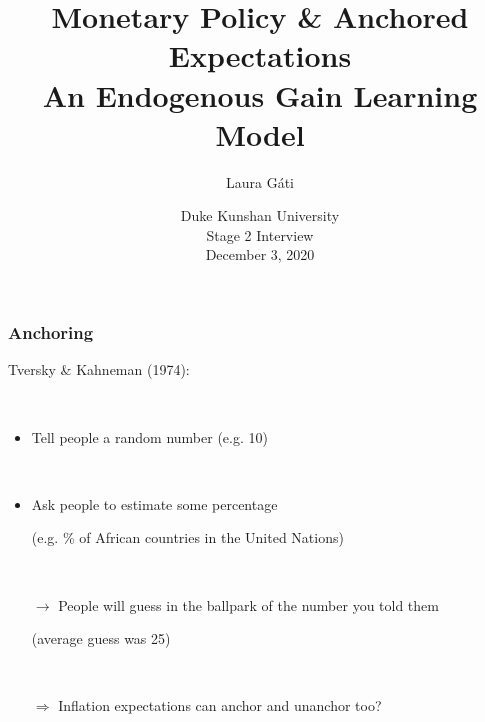 \documentclass[10pt]{beamer}
\author[]{Laura G\'ati}
\institute[]{Boston College}
\title[]{Monetary Policy \& Anchored Expectations \\
An Endogenous Gain Learning Model}
\date[]{Duke Kunshan University \\
\vspace{0.2cm}
Stage 2 Interview \\
\vspace{0.2cm}
December 3, 2020}
\begin{document}
\begin{frame}[plain] %

\maketitle

\end{frame}




%	
%
%
%


\begin{frame}
	\frametitle{Anchoring}
	\label{kahneman}

Tversky \& Kahneman (1974): 

\


\begin{itemize}
\item Tell people a random number (e.g. 10)

\

\item Ask people to estimate some percentage

\vspace{0.1cm}

\item[] (e.g. \% of African countries in the United Nations)

\

\pause
\item[$\rightarrow$] People will guess in the ballpark of the number you told them 

\vspace{0.1cm}


\item[] (average guess was 25)

\

\pause
\item[$\Rightarrow$] Inflation expectations can anchor and unanchor too?
\end{itemize}

	\end{frame}
\end{document}
